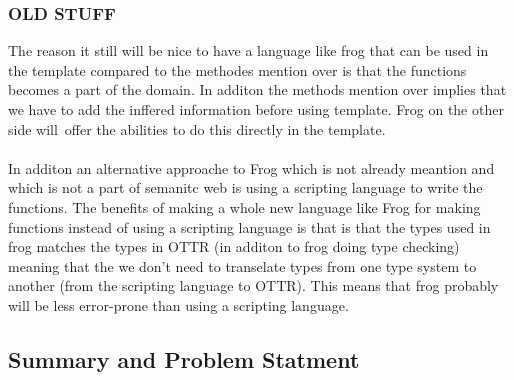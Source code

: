 \subsubsection{OLD STUFF}
The reason it still will be nice to have a language like frog that can be used in the template compared to the 
methodes mention over is that the functions becomes a part of the domain. In additon the methods mention over implies
that we have to add the inffered information before using template. Frog on the other side will offer the abilities to 
do this directly in the template. 
\\ \\
In additon an alternative approache to Frog which is not already meantion and which is not a part of semanitc web 
is using a scripting language to write the functions.
The benefits of making a whole new language like Frog for making functions instead of using a scripting language is 
that is that the types used in frog matches the types in OTTR (in additon to frog doing type checking) meaning that 
the we don't need to transelate types from one type system to another (from the scripting language to OTTR). This means 
that frog probably will be less error-prone than using a scripting language.

\subsection{Summary and Problem Statment}
